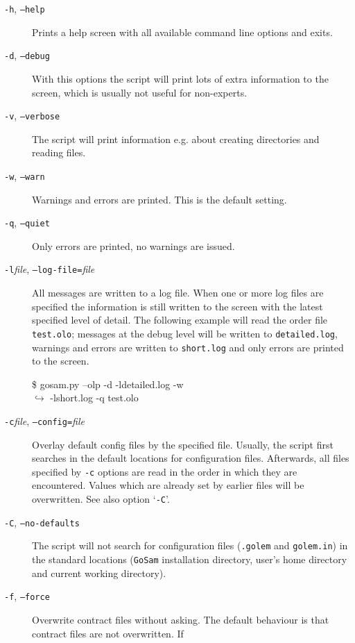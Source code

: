 \documentclass[11pt,a4paper]{refrep}
\newcommand{\golemversion}{{1{.}0}}
\newcommand{\golemv}[1][\golemversion]{{\tt GoSam}\xspace}
\newcommand{\contl}{{\ensuremath{\hookrightarrow}}}
\begin{document}
\begin{description}
\item[\texttt{-h}, \texttt{--help}]
      Prints a help screen with all available command line options and exits.
\item[\texttt{-d}, \texttt{--debug}] 
      With this options the script will print lots of extra information to
      the screen, which is usually not useful for non-experts.
\item[\texttt{-v}, \texttt{--verbose}] 
      The script will print information e.g. about creating directories
      and reading files.
\item[\texttt{-w}, \texttt{--warn}]
      Warnings and errors are printed. This is the default setting.
\item[\texttt{-q}, \texttt{--quiet}]
      Only errors are printed, no warnings are issued.
\item[\texttt{-l}\textit{file}, \texttt{--log-file=}\textit{file}]
      All messages are written to a log file. When one or more log files
      are specified the information is still written to the screen with
      the latest specified level of detail. The following example will
      read the order file \texttt{test.olo}; messages at the debug
      level will be written to \texttt{detailed.log}, warnings and
      errors are written to \texttt{short.log} and only errors are printed
      to the screen.
      \begin{example}
\$ gosam.py --olp -d -ldetailed.log -w \\
	\contl{} -lshort.log -q test.olo
      \end{example}
\item[\texttt{-c}\textit{file}, \texttt{--config=}\textit{file}]
      Overlay default config files by the specified file.
      Usually, the script first searches in the default locations for
      configuration files. Afterwards, all files specified by \texttt{-c}
      options are read in the order in which they are encountered. Values
      which are already set by earlier files will be overwritten.
      See also option `\texttt{-C}'.
\item[\texttt{-C}, \texttt{--no-defaults}]
      The script will not search for configuration
      files (\texttt{.golem} and \texttt{golem.in}) in the standard locations
      (\golemv{} installation directory, user's home directory and
      current working directory).
\item[\texttt{-f}, \texttt{--force}] Overwrite contract files without asking.
      The default behaviour is that contract files are not overwritten. If

\end{description}
\end{document}
